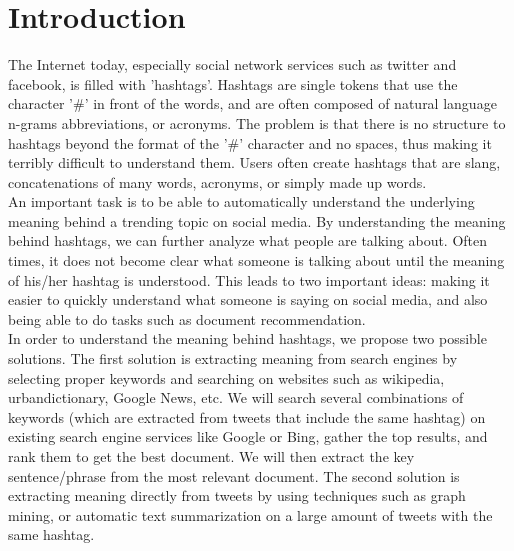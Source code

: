 \documentclass{sig-alternate}
\begin{document}
\section{Introduction}
The Internet today, especially social network services such as twitter and facebook, is filled with 'hashtags'. Hashtags are single tokens that use the character '\#' in front of the words, and are often composed of natural language n-grams abbreviations, or acronyms. The problem is that there is no structure to hashtags beyond the format of the '\#' character and no spaces, thus making it terribly difficult to understand them. Users often create hashtags that are slang, concatenations of many words, acronyms, or simply made up words.\\
An important task is to be able to automatically understand the underlying meaning behind a trending topic on social media. By understanding the meaning behind hashtags, we can further analyze what people are talking about. Often times, it does not become clear what someone is talking about until the meaning of his/her hashtag is understood. This leads to two important ideas: making it easier to quickly understand what someone is saying on social media, and also being able to do tasks such as document recommendation.\\
In order to understand the meaning behind hashtags, we propose two possible solutions. The first solution is extracting meaning from search engines by selecting proper keywords and searching on websites such as wikipedia, urbandictionary, Google News, etc. We will search several combinations of keywords (which are extracted from tweets that include the same hashtag) on existing search engine services like Google or Bing, gather the top results, and rank them to get the best document. We will then extract the key sentence/phrase from the most relevant document. The second solution is extracting meaning directly from tweets by using techniques such as graph mining, or automatic text summarization on a large amount of tweets with the same hashtag.\\
\end{document}
